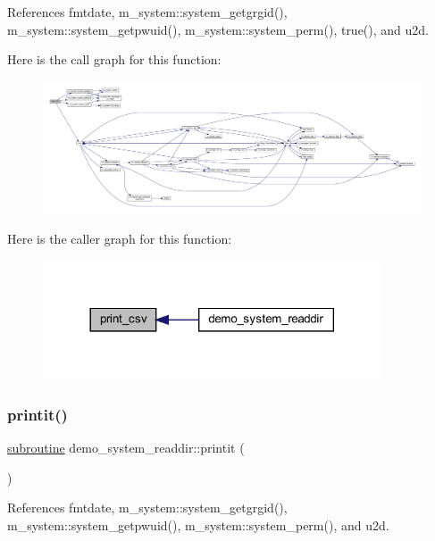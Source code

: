 References fmtdate, m\+\_\+system\+::system\+\_\+getgrgid(), m\+\_\+system\+::system\+\_\+getpwuid(), m\+\_\+system\+::system\+\_\+perm(), true(), and u2d.

Here is the call graph for this function\+:
\nopagebreak
\begin{figure}[H]
\begin{center}
\leavevmode
\includegraphics[width=350pt]{__ls_8f90_a4299f4bb3561e562301b7fed91e7c673_cgraph}
\end{center}
\end{figure}
Here is the caller graph for this function\+:
\nopagebreak
\begin{figure}[H]
\begin{center}
\leavevmode
\includegraphics[width=284pt]{__ls_8f90_a4299f4bb3561e562301b7fed91e7c673_icgraph}
\end{center}
\end{figure}
\mbox{\label{__ls_8f90_a776aaa5526c5060cfed769a9836bd8da}} 
\subsubsection{\texorpdfstring{printit()}{printit()}}
{\footnotesize\ttfamily \hyperlink{M__stopwatch_83_8txt_acfbcff50169d691ff02d4a123ed70482}{subroutine} demo\+\_\+system\+\_\+readdir\+::printit (\begin{DoxyParamCaption}{ }\end{DoxyParamCaption})}



References fmtdate, m\+\_\+system\+::system\+\_\+getgrgid(), m\+\_\+system\+::system\+\_\+getpwuid(), m\+\_\+system\+::system\+\_\+perm(), and u2d.

